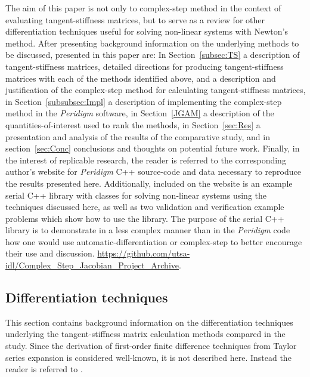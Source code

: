 \documentclass[preprint,12pt]{elsarticle}
\begin{document}
The aim of this paper is not only to   complex-step method in the context of evaluating tangent-stiffness matrices, but to serve as a review for other differentiation techniques useful for solving non-linear systems with Newton's method. After presenting background information on the underlying methods to be discussed, presented in this paper are: In Section~\ref{subsec:TS} a description of tangent-stiffness matrices, detailed directions for producing tangent-stiffness matrices with each of the methods identified above, and a description and justification of the   complex-step method for calculating tangent-stiffness matrices, in Section~\ref{subsubsec:Impl} a description of implementing the complex-step method in the \emph{Peridigm} software, in Section~\ref{JGAM} a description of the quantities-of-interest used to rank the methods, in Section~\ref{sec:Res} a presentation and analysis of the results of the comparative study, and in section~\ref{sec:Conc} conclusions and thoughts on potential future work.  Finally, in the interest of replicable research, the reader is referred to the corresponding author's website for \emph{Peridigm} C++ source-code and data necessary to reproduce the results presented here. Additionally, included on the website is an example serial C++ library with classes for solving non-linear systems using the techniques discussed here, as well as two validation and verification example problems which show how to use the library.  The purpose of the serial C++ library is to demonstrate in a less complex manner than in the \emph{Peridigm} code how one would use automatic-differentiation or complex-step to better encourage their use and discussion.   \href{https://github.com/utsa-idl/Complex_Step_Jacobian_Project_Archive}{https://github.com/utsa-idl/Complex\_Step\_Jacobian\_Project\_Archive}.

\subsection{Differentiation techniques}

This section contains background information on the differentiation techniques underlying the tangent-stiffness matrix calculation methods compared in the study. Since the derivation of first-order finite difference techniques from Taylor series expansion is considered well-known, it is not described here.  Instead the reader is referred to \cite[Chap. 4.1.3]{chapra2010}.
\end{document}
